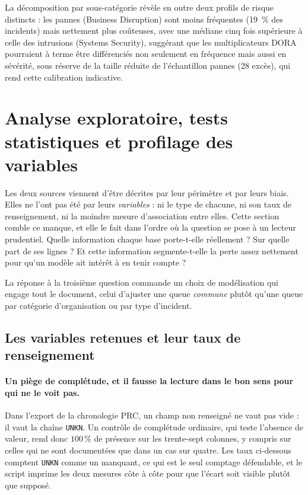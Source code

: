 La décomposition par sous-catégorie révèle en outre deux profils de risque
distincts : les pannes (\og Business Disruption\fg{}) sont moins fréquentes
(19~\% des incidents) mais nettement plus coûteuses, avec une médiane cinq
fois supérieure à celle des intrusions (\og Systems Security\fg{}), suggérant que
les multiplicateurs DORA pourraient à terme être différenciés non seulement
en fréquence mais aussi en sévérité, sous réserve de la taille réduite de
l'échantillon \og pannes\fg{} (28 excès), qui rend cette calibration indicative.




\section{Analyse exploratoire, tests statistiques et profilage des variables}
\label{sec:profilage-variables}

Les deux sources viennent d'être décrites par leur périmètre et par leurs biais. Elles ne
l'ont pas été par leurs \emph{variables} : ni le type de chacune, ni son taux de renseignement,
ni la moindre mesure d'association entre elles. Cette section comble ce manque, et elle le fait
dans l'ordre où la question se pose à un lecteur prudentiel. Quelle information chaque base
porte-t-elle réellement ? Sur quelle part de ses lignes ? Et cette information segmente-t-elle
la perte assez nettement pour qu'un modèle ait intérêt à en tenir compte ?

La réponse à la troisième question commande un choix de modélisation qui engage tout le
document, celui d'ajuster une queue \emph{commune} plutôt qu'une queue par catégorie
d'organisation ou par type d'incident.

\subsection{Les variables retenues et leur taux de renseignement}
\label{subsec:table-variables}

\paragraph{Un piège de complétude, et il fausse la lecture dans le bon sens pour qui ne le voit
pas.} Dans l'export de la chronologie PRC, un champ non renseigné ne vaut pas vide : il vaut la
chaîne \texttt{UNKN}. Un contrôle de complétude ordinaire, qui teste l'absence de valeur, rend
donc $100\,\%$ de présence sur les trente-sept colonnes, y compris sur celles qui ne sont
documentées que dans un cas sur quatre. Les taux ci-dessous comptent \texttt{UNKN} comme un
manquant, ce qui est le seul comptage défendable, et le script imprime les deux mesures côte à
côte pour que l'écart soit visible plutôt que supposé.

